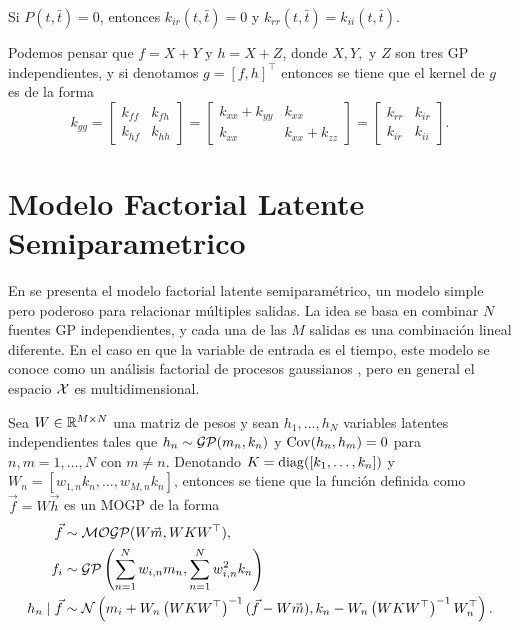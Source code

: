 \begin{proposition}
	Si \(P(t, \bar{t}) = 0\), entonces \(k_{ir}(t, \bar{t}) = 0\) y \(k_{rr}(t, \bar{t}) = k_{ii}(t, \bar{t})\).
\end{proposition}

Podemos pensar que \(f = X + Y\) y \(h = X + Z\), donde \(X, Y,\) y \(Z\) son tres GP independientes, y si denotamos \(g = [f, h]^\top\) entonces se tiene que el kernel de \(g\) es de la forma
\begin{equation*}
	k_{gg} = \begin{bmatrix} k_{ff} & k_{fh} \\ k_{hf} & k_{hh} \end{bmatrix} = \begin{bmatrix} k_{xx} + k_{yy} & k_{xx} \\ k_{xx} & k_{xx} + k_{zz} \end{bmatrix} = \begin{bmatrix} k_{rr} & k_{ir} \\ k_{ir} & k_{ii} \end{bmatrix}.
\end{equation*}

\section{Modelo Factorial Latente Semiparametrico}

En \cite{teh2005semiparametric} se presenta el modelo factorial latente semiparamétrico, un modelo simple pero poderoso para relacionar múltiples salidas. La idea se basa en combinar \(N\) fuentes GP independientes, y cada una de las \(M\) salidas es una combinación lineal diferente. En el caso en que la variable de entrada es el tiempo, este modelo se conoce como un análisis factorial de procesos gaussianos \cite{50}, pero en general el espacio \(\mathcal{X}\) es multidimensional.

Sea \(W \in \mathbb{R}^{M \times N}\) una matriz de pesos y sean \(h_1, \dotsc, h_N\) variables latentes independientes tales que \(h_{n} \sim \operatorname{\mathcal{GP}}(m_{n}, k_{n}) \) y \(\operatorname{Cov}(h_{n}, h_{m}) = 0\) para \(n, m = 1, \dotsc, N\) con \(m \neq n\). Denotando \(K = \operatorname{diag}([k_{1}, \dotsc, k_{n}])\) y \(W_{n} = [w_{1, n} k_{n}, \dotsc, w_{M,n} k_{n}]\), entonces se tiene que la función definida como \(\vec{f} = W \vec{h}\) es un MOGP de la forma
\begin{align*}
	\vec{f}				&\sim \operatorname{\mathcal{MOGP}}(W \vec{m}, WKW^{\top}), \\
	f_{i}				&\sim \operatorname{\mathcal{GP}} \left(\sum_{n=1}^{N} w_{i, n} m_{n}, \sum_{n=1}^{N} w_{i,n}^{2} k_{n} \right) \\
	h_{n} \mid \vec{f}	&\sim \mathcal{N}\left(m_{i} + W_{n} \left(WKW^{\top}\right)^{-1} (\vec{f} - W\vec{m}), k_{n} - W_{n} \left(WKW^{\top}\right)^{-1} W_{n}^{\top}\right).
\end{align*}

